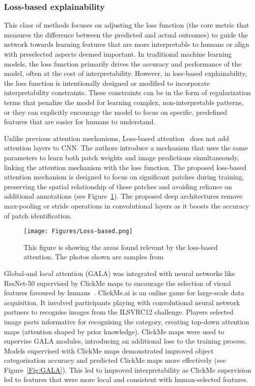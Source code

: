 \subsubsection{Loss-based explainability}

This class of methods focuses on adjusting the loss function (\ie the core metric that measures the difference between the predicted and actual outcomes) to guide the network towards learning features that are more interpretable to humans or align with preselected aspects deemed important. In traditional machine learning models, the loss function primarily drives the accuracy and performance of the model, often at the cost of interpretability. However, in loss-based explainability, the loss function is intentionally designed or modified to incorporate interpretability constraints. These constraints can be in the form of regularization terms that penalize the model for learning complex, non-interpretable patterns, or they can explicitly encourage the model to focus on specific, predefined features that are easier for humans to understand.

Unlike previous attention mechanisms, Loss-based attention~\cite{ShiXXCLLG21} does not add attention layers to CNN. The authors introduce a mechanism that uses the same parameters to learn both patch weights and image predictions simultaneously, linking the attention mechanism with the loss function.  The proposed loss-based attention mechanism is designed to focus on significant patches during training, preserving the spatial relationship of these patches and avoiding reliance on additional annotations (see Figure~\ref{Fig:loss-based}). The proposed deep architectures remove max-pooling or stride operations in convolutional layers as it boosts the accuracy of patch identification.

\begin{figure}[ht!]
	\begin{center}
		\texttt{[image: Figures/Loss-based.png]}
	\end{center}
	\caption{This figure is showing the areas found relevant by the loss-based attention. The photos shown are samples from~\cite{ShiXXCLLG21}}
	\label{Fig:loss-based}
\end{figure} 



Global-and local attention (GALA) was integrated with neural networks like ResNet-50 supervised by ClickMe maps to encourage the selection of visual features favoured by humans~\cite{LinsleySES19}. ClickMe.ai is an online game for large-scale data acquisition. It involved participants playing with convolutional neural network partners to recognise images from the ILSVRC12 challenge. Players selected image parts informative for recognising the category, creating top-down attention maps (\ie attention shaped by prior knowledge). ClickMe maps were used to supervise GALA modules, introducing an additional loss to the training process. Models supervised with ClickMe maps demonstrated improved object categorisation accuracy and predicted ClickMe maps more effectively (see Figure~\ref{Fig:GALA}). This led to improved interpretability as ClickMe supervision led to features that were more local and consistent with human-selected features.

